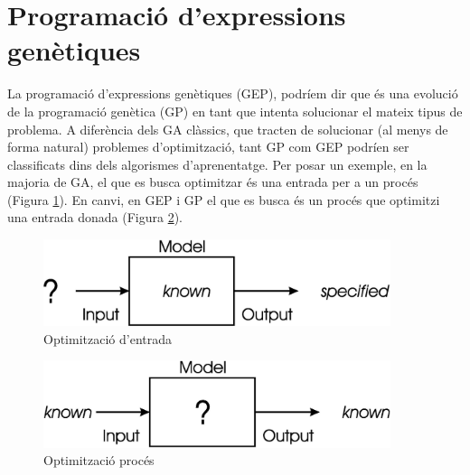 

\section{Programació d'expressions genètiques} %
\label{sec:Programacio d'expressions genetiques}

La programació d'expressions genètiques (GEP), podríem dir que és una evolució de
la programació genètica (GP) en tant que intenta solucionar el mateix tipus de
problema.  A diferència dels GA clàssics, que tracten de solucionar (al menys de
forma natural) problemes d'optimització, tant GP com GEP podríen ser
classificats dins dels algorismes d'aprenentatge.  Per posar un exemple, en la
majoria de GA, el que es busca optimitzar és una entrada per a un procés
(Figura \ref{fig:ch1-4}).  En canvi, en GEP i GP el que es busca és un procés que
optimitzi una entrada donada (Figura \ref{fig:ch1-5}).

\begin{figure} \centering \includegraphics[width=4in]{intro/1-4.jpg}
\caption{\label{fig:ch1-4}Optimització d'entrada}
\end{figure}
\begin{figure} \centering \includegraphics[width=4in]{intro/1-5.jpg}
\caption{\label{fig:ch1-5}Optimització procés}
\end{figure}

